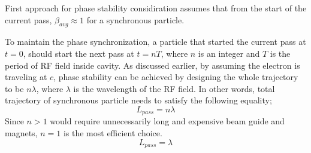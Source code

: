 \documentclass[a4paper,oneside,12pt]{report}
\numberwithin{equation}{chapter}
\begin{document}
First approach for phase stability considiration assumes that from the start of the current pass, $\beta_{avg} \approx 1$ for a synchronous particle. 

To maintain the phase synchronization, a particle that started the current pass at $t=0$, should start the next pass at $t=nT$, where $n$ is an integer and $T$ is the period of RF field inside cavity.
As discussed earlier, by assuming the electron is traveling at $c$, phase stability can be achieved by designing the whole trajectory to be $n \lambda$, where $\lambda$ is the wavelength of the RF field. 
In other words, total trajectory of synchronous particle needs to satisfy the following equality;
\begin{equation*}
    L_{pass} = n \lambda
\end{equation*} 
Since $n>1$ would require unnecessarily long and expensive beam guide and magnets, $n=1$ is the most efficient choice.
\begin{equation}
    L_{pass} = \lambda
\end{equation} 
\end{document}
